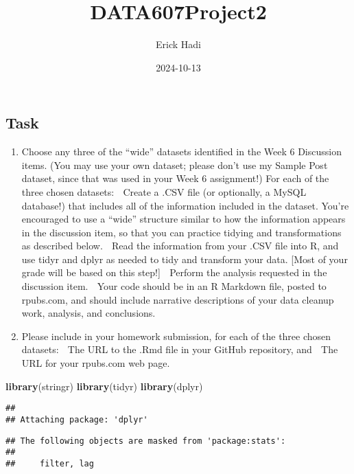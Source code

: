 \documentclass[
]{article}
\title{DATA607Project2}
\author{Erick Hadi}
\date{2024-10-13}
\newenvironment{Shaded}{\begin{snugshade}}{\end{snugshade}}
\newcommand{\FunctionTok}[1]{\textcolor[rgb]{0.13,0.29,0.53}{\textbf{#1}}}
\newcommand{\NormalTok}[1]{#1}
\providecommand{\tightlist}{%
  \setlength{\itemsep}{0pt}\setlength{\parskip}{0pt}}
\begin{document}
\maketitle

\subsection{Task}\label{task}

\begin{enumerate}
\def\labelenumi{(\arabic{enumi})}
\tightlist
\item
  Choose any three of the ``wide'' datasets identified in the Week 6
  Discussion items. (You may use your own dataset; please don't use my
  Sample Post dataset, since that was used in your Week 6 assignment!)
  For each of the three chosen datasets:  Create a .CSV file (or
  optionally, a MySQL database!) that includes all of the information
  included in the dataset. You're encouraged to use a ``wide'' structure
  similar to how the information appears in the discussion item, so that
  you can practice tidying and transformations as described below. 
  Read the information from your .CSV file into R, and use tidyr and
  dplyr as needed to tidy and transform your data. {[}Most of your grade
  will be based on this step!{]}  Perform the analysis requested in the
  discussion item.  Your code should be in an R Markdown file, posted
  to rpubs.com, and should include narrative descriptions of your data
  cleanup work, analysis, and conclusions.
\item
  Please include in your homework submission, for each of the three
  chosen datasets:  The URL to the .Rmd file in your GitHub repository,
  and  The URL for your rpubs.com web page.
\end{enumerate}

\begin{Shaded}
\begin{Highlighting}[]
\FunctionTok{library}\NormalTok{(stringr)}
\FunctionTok{library}\NormalTok{(tidyr)}
\FunctionTok{library}\NormalTok{(dplyr)}
\end{Highlighting}
\end{Shaded}

\begin{verbatim}
## 
## Attaching package: 'dplyr'
\end{verbatim}

\begin{verbatim}
## The following objects are masked from 'package:stats':
## 
##     filter, lag
\end{verbatim}
\end{document}
